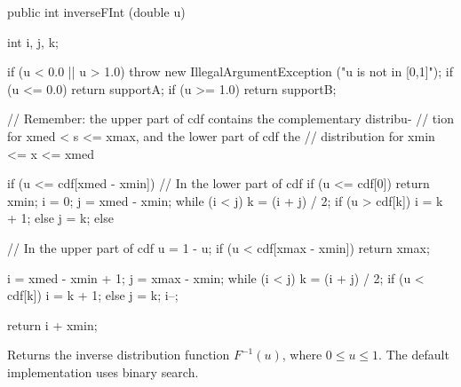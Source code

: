\begin{code}

   public int inverseFInt (double u)\begin{hide} {
      int i, j, k;

      if (u < 0.0 || u > 1.0)
         throw new IllegalArgumentException ("u is not in [0,1]");
      if (u <= 0.0)
         return supportA;
      if (u >= 1.0)
         return supportB;


      // Remember: the upper part of cdf contains the complementary distribu-
      // tion for xmed < s <= xmax, and the lower part of cdf the
      // distribution for xmin <= x <= xmed

      if (u <= cdf[xmed - xmin]) {
         // In the lower part of cdf
         if (u <= cdf[0])
            return xmin;
         i = 0;
         j = xmed - xmin;
         while (i < j) {
            k = (i + j) / 2;
            if (u > cdf[k])
               i = k + 1;
            else
               j = k;
         }
      }
      else {
         // In the upper part of cdf
         u = 1 - u;
         if (u < cdf[xmax - xmin])
            return xmax;

         i = xmed - xmin + 1;
         j = xmax - xmin;
         while (i < j) {
            k = (i + j) / 2;
            if (u < cdf[k])
               i = k + 1;
            else
               j = k;
         }
         i--;
      }

      return i + xmin;
   }\end{hide}
\end{code}
\begin{tabb}  Returns the inverse distribution function
  $F^{-1}(u)$, where $0\le u\le 1$.
  The default implementation uses binary search.
\end{tabb}
\begin{htmlonly}
\end{htmlonly}
\begin{code}\begin{hide}
}\end{hide}
\end{code}

